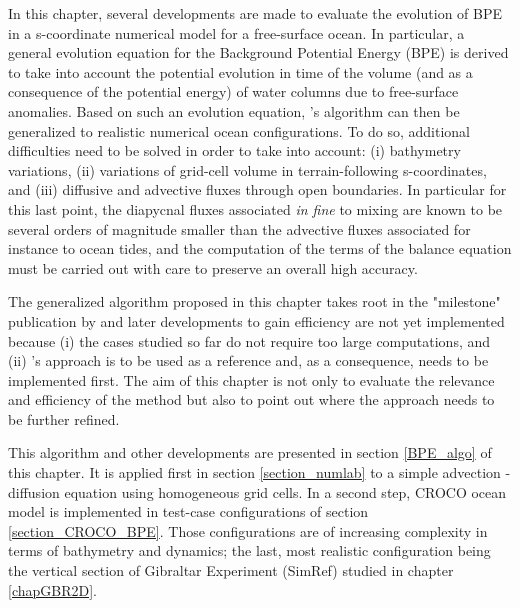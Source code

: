 In this chapter, several developments are made to evaluate the evolution of BPE in a s-coordinate numerical model for a free-surface ocean. In particular, a general evolution equation for the Background Potential Energy (BPE) is derived to take into account the potential evolution in time of the volume (and as a consequence of the potential energy) of water columns due to free-surface anomalies.
Based on such an evolution equation, \cite{winters_available_1995}'s algorithm can then be generalized to realistic numerical ocean configurations. To do so, additional difficulties need to be solved in order to take into account: (i) bathymetry variations, (ii) variations of grid-cell volume in terrain-following s-coordinates, and (iii) diffusive and advective fluxes through open boundaries. In particular for this last point, the diapycnal fluxes associated \textit{in fine} to mixing are known to be several orders of magnitude smaller than the advective fluxes associated for instance to ocean tides, and the computation of the terms of the balance equation must be carried out with care to preserve an overall high accuracy.

The generalized algorithm proposed in this chapter takes root in the "milestone" publication by \citet{winters_available_1995} %
and later developments to gain efficiency are not yet implemented because (i) the cases studied so far do not require too large computations, and (ii) \citet{winters_available_1995}'s approach is to be used as a reference and, as a consequence, needs to be implemented first. The aim of this chapter is not only to evaluate the relevance and efficiency of the method but also to point out where the approach needs to be further refined.


This algorithm and other developments are presented in section \ref{BPE_algo} of this chapter. It is applied first in section \ref{section_numlab} to a simple advection - diffusion equation using homogeneous grid cells. In a second step, CROCO ocean model is implemented in test-case configurations of section \ref{section_CROCO_BPE}. Those configurations are of increasing complexity in terms of bathymetry and dynamics; the last, most realistic configuration being the vertical section of Gibraltar Experiment (SimRef) studied in chapter \ref{chapGBR2D}.

